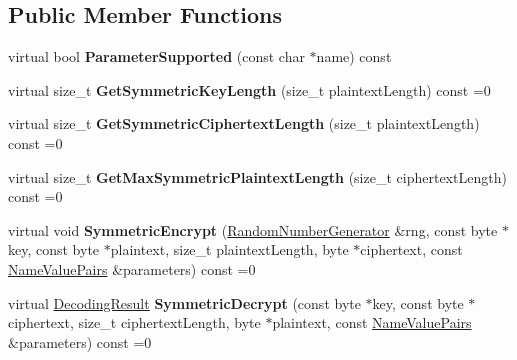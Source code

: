 \subsection*{Public Member Functions}
\begin{DoxyCompactItemize}
\item 
\hypertarget{class_d_l___symmetric_encryption_algorithm_adeaf9c95829451d891ac709f147206df}{
virtual bool {\bfseries ParameterSupported} (const char $\ast$name) const }
\label{class_d_l___symmetric_encryption_algorithm_adeaf9c95829451d891ac709f147206df}

\item 
\hypertarget{class_d_l___symmetric_encryption_algorithm_a00612dfbc62708098ff434c1ff939dfe}{
virtual size\_\-t {\bfseries GetSymmetricKeyLength} (size\_\-t plaintextLength) const =0}
\label{class_d_l___symmetric_encryption_algorithm_a00612dfbc62708098ff434c1ff939dfe}

\item 
\hypertarget{class_d_l___symmetric_encryption_algorithm_a2be1328e1b0be3531d6ab8932e680e81}{
virtual size\_\-t {\bfseries GetSymmetricCiphertextLength} (size\_\-t plaintextLength) const =0}
\label{class_d_l___symmetric_encryption_algorithm_a2be1328e1b0be3531d6ab8932e680e81}

\item 
\hypertarget{class_d_l___symmetric_encryption_algorithm_a87c67948418742d166960262964811fe}{
virtual size\_\-t {\bfseries GetMaxSymmetricPlaintextLength} (size\_\-t ciphertextLength) const =0}
\label{class_d_l___symmetric_encryption_algorithm_a87c67948418742d166960262964811fe}

\item 
\hypertarget{class_d_l___symmetric_encryption_algorithm_a96c2af6107c58ef717294f43f0a3dc8d}{
virtual void {\bfseries SymmetricEncrypt} (\hyperlink{class_random_number_generator}{RandomNumberGenerator} \&rng, const byte $\ast$key, const byte $\ast$plaintext, size\_\-t plaintextLength, byte $\ast$ciphertext, const \hyperlink{class_name_value_pairs}{NameValuePairs} \&parameters) const =0}
\label{class_d_l___symmetric_encryption_algorithm_a96c2af6107c58ef717294f43f0a3dc8d}

\item 
\hypertarget{class_d_l___symmetric_encryption_algorithm_af10312510fe1331e79d823f4d2b6fd16}{
virtual \hyperlink{struct_decoding_result}{DecodingResult} {\bfseries SymmetricDecrypt} (const byte $\ast$key, const byte $\ast$ciphertext, size\_\-t ciphertextLength, byte $\ast$plaintext, const \hyperlink{class_name_value_pairs}{NameValuePairs} \&parameters) const =0}
\label{class_d_l___symmetric_encryption_algorithm_af10312510fe1331e79d823f4d2b6fd16}

\end{DoxyCompactItemize}



